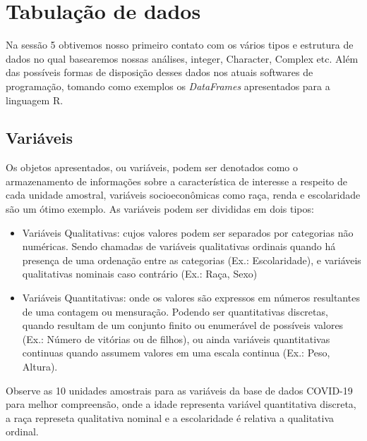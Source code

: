 \documentclass[
  letterpaper,
  DIV=11,
  numbers=noendperiod]{scrreprt}
\begin{document}

\hypertarget{tabulauxe7uxe3o-de-dados}{%
\chapter{Tabulação de dados}\label{tabulauxe7uxe3o-de-dados}}

Na sessão 5 obtivemos nosso primeiro contato com os vários tipos e
estrutura de dados no qual basearemos nossas análises, integer,
Character, Complex etc. Além das possíveis formas de disposição desses
dados nos atuais softwares de programação, tomando como exemplos os
\emph{DataFrames} apresentados para a linguagem R.

\hypertarget{variuxe1veis}{%
\section{Variáveis}\label{variuxe1veis}}

Os objetos apresentados, ou variáveis, podem ser denotados como o
armazenamento de informações sobre a característica de interesse a
respeito de cada unidade amostral, variáveis socioeconômicas como raça,
renda e escolaridade são um ótimo exemplo. As variáveis podem ser
divididas em dois tipos:

\begin{itemize}
\item
  Variáveis Qualitativas: cujos valores podem ser separados por
  categorias não numéricas. Sendo chamadas de variáveis qualitativas
  ordinais quando há presença de uma ordenação entre as categorias (Ex.:
  Escolaridade), e variáveis qualitativas nominais caso contrário (Ex.:
  Raça, Sexo)
\item
  Variáveis Quantitativas: onde os valores são expressos em números
  resultantes de uma contagem ou mensuração. Podendo ser quantitativas
  discretas, quando resultam de um conjunto finito ou enumerável de
  possíveis valores (Ex.: Número de vitórias ou de filhos), ou ainda
  variáveis quantitativas continuas quando assumem valores em uma escala
  continua (Ex.: Peso, Altura).
\end{itemize}

Observe as 10 unidades amostrais para as variáveis da base de dados
COVID-19 para melhor compreensão, onde a idade representa variável
quantitativa discreta, a raça represeta qualitativa nominal e a
escolaridade é relativa a qualitativa ordinal.
\end{document}
